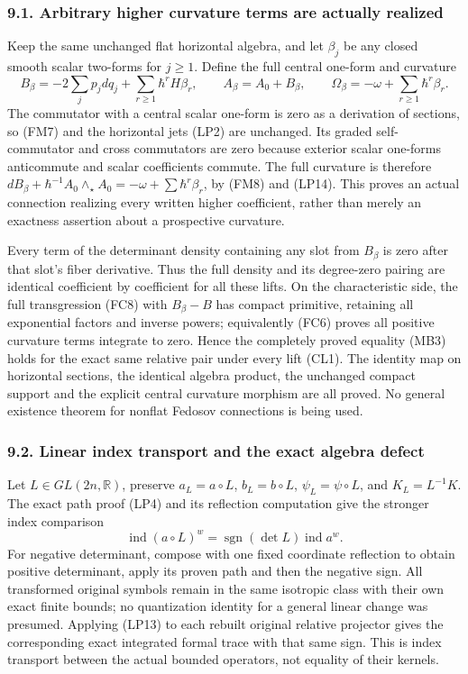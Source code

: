 \documentclass[
  11pt,
]{article}
\begin{document}
\subsubsection{9.1. Arbitrary higher curvature terms are actually
realized}\label{arbitrary-higher-curvature-terms-are-actually-realized}

Keep the same unchanged flat horizontal algebra, and let \(\beta_j\) be
any closed smooth scalar two-forms for \(j\ge1\). Define the full
central one-form and curvature \[
 B_\beta=-2\sum_jp_jdq_j+
           \sum_{r\ge1}\hbar^r H\beta_r,
 \qquad A_\beta=A_0+B_\beta,
 \qquad \Omega_\beta=-\omega+\sum_{r\ge1}\hbar^r\beta_r.
 \tag{CL1}
\] The commutator with a central scalar one-form is zero as a derivation
of sections, so (FM7) and the horizontal jets (LP2) are unchanged. Its
graded self-commutator and cross commutators are zero because exterior
scalar one-forms anticommute and scalar coefficients commute. The full
curvature is therefore
\(dB_\beta+\hbar^{-1}A_0\wedge_\star A_0=-\omega+\sum\hbar^r\beta_r\),
by (FM8) and (LP14). This proves an actual connection realizing every
written higher coefficient, rather than merely an exactness assertion
about a prospective curvature.

Every term of the determinant density containing any slot from
\(B_\beta\) is zero after that slot's fiber derivative. Thus the full
density and its degree-zero pairing are identical coefficient by
coefficient for all these lifts. On the characteristic side, the full
transgression (FC8) with \(B_\beta-B\) has compact primitive, retaining
all exponential factors and inverse powers; equivalently (FC6) proves
all positive curvature terms integrate to zero. Hence the completely
proved equality (MB3) holds for the exact same relative pair under every
lift (CL1). The identity map on horizontal sections, the identical
algebra product, the unchanged compact support and the explicit central
curvature morphism are all proved. No general existence theorem for
nonflat Fedosov connections is being used.

\subsubsection{9.2. Linear index transport and the exact algebra
defect}\label{linear-index-transport-and-the-exact-algebra-defect}

Let \(L\in GL(2n,\mathbb R)\), preserve \(a_L=a\circ L\),
\(b_L=b\circ L\), \(\psi_L=\psi\circ L\), and \(K_L=L^{-1}K\). The exact
path proof (LP4) and its reflection computation give the stronger index
comparison \[
 \operatorname{ind}(a\circ L)^w
       =\operatorname{sgn}(\det L)\operatorname{ind}a^w.
 \tag{LI1}
\] For negative determinant, compose with one fixed coordinate
reflection to obtain positive determinant, apply its proven path and
then the negative sign. All transformed original symbols remain in the
same isotropic class with their own exact finite bounds; no quantization
identity for a general linear change was presumed. Applying (LP13) to
each rebuilt original relative projector gives the corresponding exact
integrated formal trace with that same sign. This is index transport
between the actual bounded operators, not equality of their kernels.
\end{document}
